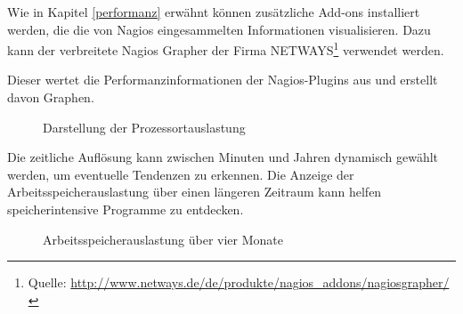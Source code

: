 Wie in Kapitel \ref{performanz} erwähnt können zusätzliche Add-ons installiert werden, die die von Nagios eingesammelten Informationen visualisieren.
Dazu kann der verbreitete Nagios Grapher der Firma NETWAYS\footnote{Quelle: \url{http://www.netways.de/de/produkte/nagios_addons/nagiosgrapher/}} verwendet werden.

Dieser wertet die Performanzinformationen der Nagios-Plugins aus und erstellt davon Graphen.

\begin{figure}[ht]
	\centering
		\caption{Darstellung der Prozessortauslastung}
		\label{iwrpload}
\end{figure}

Die zeitliche Auflösung kann zwischen Minuten und Jahren dynamisch gewählt werden, um eventuelle Tendenzen zu erkennen.
Die Anzeige der Arbeitsspeicherauslastung über einen längeren Zeitraum kann helfen speicherintensive Programme zu entdecken.
\begin{figure}[ht]
	\centering
		\caption{Arbeitsspeicherauslastung über vier Monate}
		\label{bdb-mem}
\end{figure}


